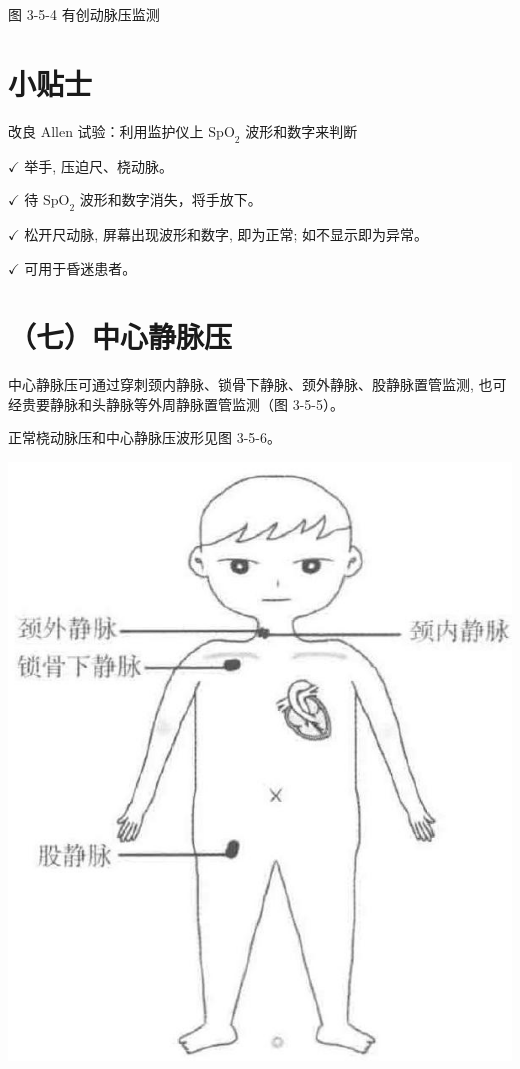 \documentclass[10pt]{article}
\begin{document}
图 3-5-4 有创动脉压监测

\section*{小贴士}
改良 Allen 试验：利用监护仪上 $\mathrm{SpO}_{2}$ 波形和数字来判断

$\checkmark$ 举手, 压迫尺、桡动脉。

$\checkmark$ 待 $\mathrm{SpO}_{2}$ 波形和数字消失，将手放下。

$\checkmark$ 松开尺动脉, 屏幕出现波形和数字, 即为正常; 如不显示即为异常。

$\checkmark$ 可用于昏迷患者。

\section*{（七）中心静脉压}
中心静脉压可通过穿刺颈内静脉、锁骨下静脉、颈外静脉、股静脉置管监测, 也可经贵要静脉和头静脉等外周静脉置管监测（图 3-5-5）。

正常桡动脉压和中心静脉压波形见图 3-5-6。

\begin{center}
\includegraphics[max width=\textwidth]{2024_07_05_645bb794a4d4f32ee0c8g-103(1)}
\end{center}
\end{document}
